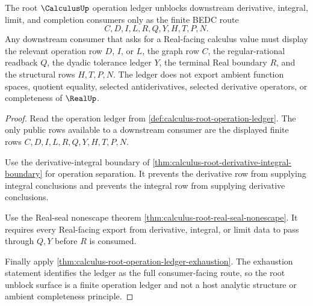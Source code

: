 \begin{theorem}
\label{thm:calculus-root-unblock-real-operation-ledger}
The root $\CalculusUp$ operation ledger unblocks downstream derivative, integral, limit, and completion consumers only as the finite BEDC route
$$
C,D,I,L,R,Q,Y,H,T,P,N .
$$
Any downstream consumer that asks for a Real-facing calculus value must display the relevant operation row $D$, $I$, or $L$, the graph row $C$, the regular-rational readback $Q$, the dyadic tolerance ledger $Y$, the terminal Real boundary $R$, and the structural rows $H,T,P,N$. The ledger does not export ambient function spaces, quotient equality, selected antiderivatives, selected derivative operators, or completeness of $\RealUp$.
\end{theorem}
\begin{proof}
Read the operation ledger from \autoref{def:calculus-root-operation-ledger}. The only public rows available to a downstream consumer are the displayed finite rows $C,D,I,L,R,Q,Y,H,T,P,N$.

Use the derivative-integral boundary of \autoref{thm:calculus-root-derivative-integral-boundary} for operation separation. It prevents the derivative row from supplying integral conclusions and prevents the integral row from supplying derivative conclusions.

Use the Real-seal nonescape theorem \autoref{thm:calculus-root-real-seal-nonescape}. It requires every Real-facing export from derivative, integral, or limit data to pass through $Q,Y$ before $R$ is consumed.

Finally apply \autoref{thm:calculus-root-operation-ledger-exhaustion}. The exhaustion statement identifies the ledger as the full consumer-facing route, so the root unblock surface is a finite operation ledger and not a host analytic structure or ambient completeness principle.
\end{proof}

